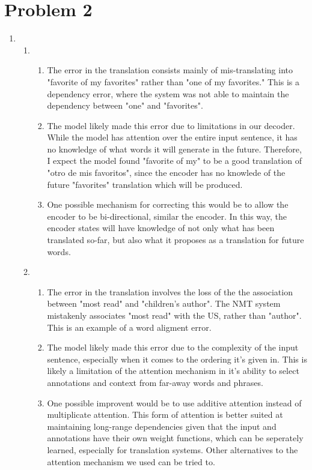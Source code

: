\documentclass[12pt]{article}
\begin{document}
\section*{Problem 2}
\begin{enumerate}[label=(\alph*)]
  \item 
    \begin{enumerate}[label=\roman*]
      \item
        \begin{enumerate}[label=\arabic*]
          \item The error in the translation consists mainly of mis-translating into "favorite of my favorites" rather than "one of my favorites." This is a dependency error, where the system was not able to maintain the dependency between "one" and "favorites".
          \item The model likely made this error due to limitations in our decoder. While the model has attention over the entire input sentence, it has no knowledge of what words it will generate in the future. Therefore, I expect the model found "favorite of my" to be a good translation of "otro de mis favoritos", since the encoder has no knowlede of the future "favorites" translation which will be produced.
          \item One possible mechanism for correcting this would be to allow the encoder to be bi-directional, similar the encoder. In this way, the encoder states will have knowledge of not only what has been translated so-far, but also what it proposes as a translation for future words.
        \end{enumerate}
      \item
        \begin{enumerate}[label=\arabic*]
          \item The error in the translation involves the loss of the the association between "most read" and "children's author". The NMT system mistakenly associates "most read" with the US, rather than "author". This is an example of a word aligment error.
          \item The model likely made this error due to the complexity of the input sentence, especially when it comes to the ordering it's given in. This is likely a limitation of the attention mechanism in it's ability to select annotations and context from far-away words and phrases.
          \item One possible improvent would be to use additive attention instead of multiplicate attention. This form of attention is better suited at maintaining long-range dependencies given that the input and annotations have their own weight functions, which can be seperately learned, especially for translation systems. Other alternatives to the attention mechanism we used can be tried to.

\end{enumerate}
\end{enumerate}
\end{enumerate}
\end{document}
